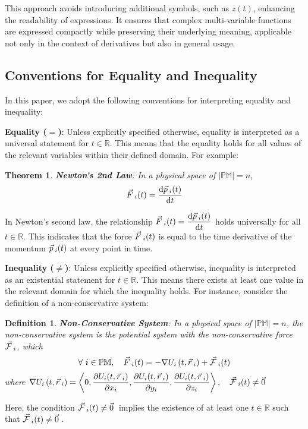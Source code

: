 \documentclass[12pt]{amsart}
\newtheorem*{theorem*}{Theorem}
\newtheorem*{definition*}{Definition}
\let\oldvec\vec
\renewcommand{\vec}[1]{\oldvec{#1}\hspace{0.1em}}
\begin{document}
   This approach avoids introducing additional symbols, such as $z(t)$, enhancing the readability of expressions. It ensures that complex multi-variable functions are expressed compactly while preserving their underlying meaning, applicable not only in the context of derivatives but also in general usage.
   
\subsection{Conventions for Equality and Inequality}

In this paper, we adopt the following conventions for interpreting equality and inequality:

\textbf{Equality ($=$)}: Unless explicitly specified otherwise, equality is interpreted as a universal statement for $t \in \mathbb{R}$. This means that the equality holds for all values of the relevant variables within their defined domain. For example:
    \begin{theorem*}
     \textbf{Newton's 2nd Law}: In a physical space of $\left | \mathbb{PM} \right | = n$, $$ \vec{F}_{i}(t) = \dfrac{\mathrm{d} \vec{p}_{i}(t)}{\mathrm{d} t} $$
    \end{theorem*}
   In Newton's second law, the relationship $\vec{F}_i(t) = \dfrac{\mathrm{d} \vec{p}_i(t)}{\mathrm{d} t}$
   holds universally for all $t \in \mathbb{R}$. This indicates that the force $\vec{F}_i(t)$ is equal to the time derivative of the momentum $\vec{p}_i(t)$ at every point in time.

\textbf{Inequality ($\neq$)}: Unless explicitly specified otherwise, inequality is interpreted as an existential statement for $t \in \mathbb{R}$. This means there exists at least one value in the relevant domain for which the inequality holds. For instance, consider the definition of a non-conservative system:
   \begin{definition*}
    \textbf{Non-Conservative System}: In a physical space of $\left | \mathbb{PM} \right | = n$, the non-conservative system is the potential system with the non-conservative force $\vec{\mathcal{F}}_i$, which $$\forall \  i \in \mathbb{PM}, \quad \vec{F}_i (t) = - \nabla U_i \left ( t, \vec{r}_i  \right) + \vec{\mathcal{F}}_i(t) $$ where $ \nabla  U_i \left ( t, \vec{r}_i \right )  = \left < 0, \dfrac{\partial U_i (t, \vec{r}_i)}{\partial x_i}, \dfrac{\partial U_i (t, \vec{r}_i)}{\partial y_i}, \dfrac{\partial U_i (t, \vec{r}_i)}{\partial z_i} \right >, \quad \vec{\mathcal{F}}_i (t) \ne \vec{0} $
\end{definition*}
   Here, the condition $\vec{\mathcal{F}}_i(t) \neq \vec{0}$ implies the existence of at least one $t \in \mathbb{R}$ such that $\vec{\mathcal{F}}_i(t) \neq \vec{0}$.
\end{document}
